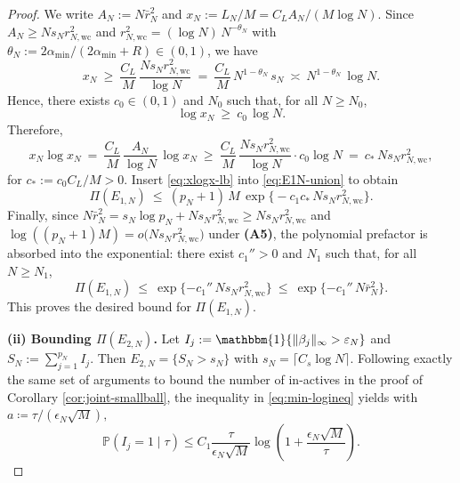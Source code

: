 \documentclass[11pt]{article}
\theoremstyle{plain}
\theoremstyle{definition}
\theoremstyle{plain}
\begin{document}
\begin{proof}
We write $A_N:=N\bar r_N^2$ and $x_N:={L_N}/{M}={C_L A_N}/{(M \log N)}$.
Since $A_N\ge N s_N r_{N,\mathrm{wc}}^2$ and $r_{N,\mathrm{wc}}^2=(\log N)\,N^{-\theta_N}$ with 
$\theta_N:={2\alpha_{\min}}/{(2\alpha_{\min}+R)}\in(0,1)$, we have
\[
x_N\ \ge\ \frac{C_L}{M}\,\frac{N s_N r_{N,\mathrm{wc}}^2}{\log N}
\ =\ \frac{C_L}{M}\,N^{1-\theta_N}\,s_N
\ \asymp\ N^{1-\theta_N}\,\log N.
\]
Hence, there exists $c_0\in(0,1)$ and $N_0$ such that, for all $N\ge N_0$,
\begin{equation}\label{eq:logxN-lb}
\log x_N \ \ge\ c_0\,\log N.
\end{equation}
Therefore,
\begin{equation}\label{eq:xlogx-lb}
x_N\log x_N
\ =\ \frac{C_L}{M}\,\frac{A_N}{\log N}\,\log x_N
\ \ge\ 
\frac{C_L}{M}\,\frac{N s_N r_{N,\mathrm{wc}}^2}{\log N}\cdot c_0\log N
\ =\ c_\ast\,N s_N r_{N,\mathrm{wc}}^2,
\end{equation}
for $c_\ast:=c_0 C_L/M>0$.
Insert \eqref{eq:xlogx-lb} into \eqref{eq:E1N-union} to obtain
\[
\Pi(E_{1,N})
\ \le\
(p_N+1)\,M\,\exp\!\Big\{-c_1 c_\ast\,N s_N r_{N,\mathrm{wc}}^2\Big\}.
\]
Finally, since $N\bar r_N^2=s_N\log p_N + N s_N r_{N,\mathrm{wc}}^2\ge N s_N r_{N,\mathrm{wc}}^2$
and $\log((p_N+1)M)=o\big(N s_N r_{N,\mathrm{wc}}^2\big)$ under \textbf{(A5)}, the polynomial prefactor is absorbed into the exponential:
there exist $c_1''>0$ and $N_1$ such that, for all $N\ge N_1$,
\[
\Pi(E_{1,N})\ \le\ \exp\{-c_1''\,N s_N r_{N,\mathrm{wc}}^2\}\ \le\ \exp\{-c_1''\,N\bar r_N^2\}.
\]
This proves the desired bound for $\Pi(E_{1,N})$.

\medskip\noindent\textbf{(ii) Bounding $\Pi(E_{2,N})$.}
Let $I_j:=\mathbbm{1}\{\|\beta_j\|_\infty>\varepsilon_N\}$ and $S_N:=\sum_{j=1}^{p_N} I_j$.
Then $E_{2,N}=\{S_N>s_N\}$ with $s_N=\lceil C_s\log N\rceil$. Following exactly the same set of arguments to bound the number of in-actives in the proof of Corollary \ref{cor:joint-smallball}, the inequality in \eqref{eq:min-logineq} yields with $a \coloneqq \tau/(\epsilon_N \sqrt{M}), $
\[
\mathbb{P}(I_j =1 \mid \tau) \le C_1 \frac{\tau}{\epsilon_N \sqrt{M}} \log \left(1+ \frac{\epsilon_N \sqrt{M}}{\tau} \right).
\]


\end{proof}
\end{document}
